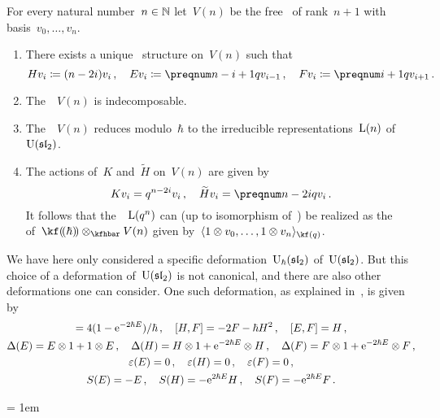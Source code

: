 \documentclass[a4paper, 11pt, oneside]{scrartcl}
\begin{document}
\begin{theorem}
  For every natural number~$n \in \mathbb{N}$ let~$V(n)$ be the free~\module{$\kfhbar$} of rank~$n+1$ with basis~$v_0, \dotsc, v_n$.
  \begin{enumerate}
    \item
      There exists a unique~ structure on~$V(n)$ such that
      \[
        H v_i \defined (n - 2i) v_i \,,
        \quad
        E v_i \defined \qnum{n - i + 1} v_{i-1} \,,
        \quad
        F v_i \defined \qnum{i+1} v_{i+1} \,.
      \]
    \item
      The~~$V(n)$ is indecomposable.
    \item
      The~~$V(n)$ reduces modulo~$\hbar$ to the irreducible representations~$\operatorname{L}(n)$ of~$\operatorname{U}(\mathfrak{sl}_2)$.
    \item
      The actions of~$K$ and~$\widetilde{H}$ on~$V(n)$ are given by
      \[
        K v_i
        =
        q^{n - 2i} v_i \,,
        \quad
        \widetilde{H} v_i
        =
        \qnum{n - 2i} v_i \,.
      \]
      It follows that the~~$\operatorname{L}(q^n)$ can (up to isomorphism of~) be realized as the~ of~$\lpower{\kf}{\hbar} \tensor_{\kfhbar} V(n)$ given by~$\gen{1 \tensor v_0, \dotsc, 1 \tensor v_n}_{\kf(q)}$.
  \end{enumerate}
\end{theorem}

\begin{remark}
  We have here only considered a specific deformation~$\operatorname{U}_{\hbar}(\mathfrak{sl}_2)$ of~$\operatorname{U}(\mathfrak{sl}_2)$.
  But this choice of a deformation of~$\operatorname{U}(\mathfrak{sl}_2)$ is not canonical, and there are also other deformations one can consider.
  One such deformation, as explained in~\cite[\S 6.4,~F]{guide_to_quantum_groups}, is given by
  \begin{gather*}
    [H, E] = 4 ( 1 - \e^{-2 \hbar E} ) / \hbar \,,
    \quad
    [H, F] = -2 F - \hbar H^2 \,,
    \quad
    [E, F] = H \,,
    \\
    \Delta(E) = E \tensor 1 + 1 \tensor E \,,
    \quad
    \Delta(H) = H \tensor 1 + \e^{-2 \hbar E} \tensor H \,,
    \quad
    \Delta(F) = F \tensor 1 + \e^{-2 \hbar E} \tensor F \,,
    \\
    \varepsilon(E) = 0 \,,
    \quad
    \varepsilon(H) = 0 \,,
    \quad
    \varepsilon(F) = 0 \,,
    \\
    S(E) = -E \,,
    \quad
    S(H) = - \e^{2 \hbar E} H \,,
    \quad
    S(F) = - \e^{2 \hbar E} F \,.
  \end{gather*}
\end{remark}





\emergencystretch = 1em
\printbibliography
\end{document}
